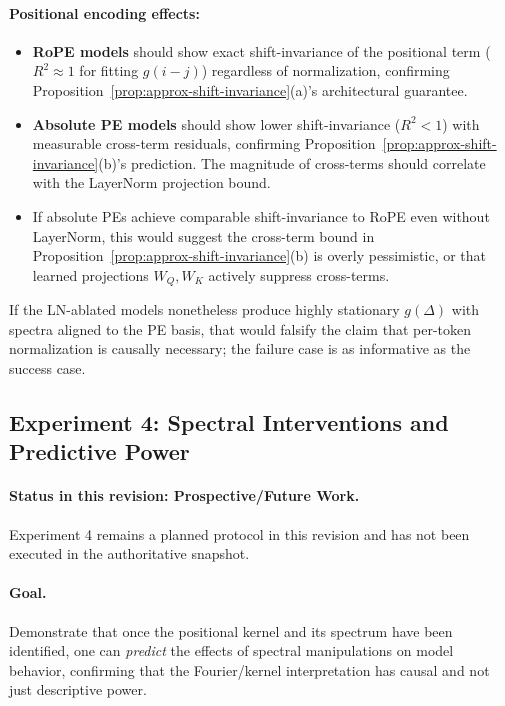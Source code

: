 \documentclass[11pt]{article}
\theoremstyle{definition}
\begin{document}
\paragraph{Positional encoding effects:}
\begin{itemize}
    \item \textbf{RoPE models} should show exact shift-invariance of the positional term ($R^2 \approx 1$ for fitting $g(i-j)$) regardless of normalization, confirming Proposition~\ref{prop:approx-shift-invariance}(a)'s architectural guarantee.
    \item \textbf{Absolute PE models} should show lower shift-invariance ($R^2 < 1$) with measurable cross-term residuals, confirming Proposition~\ref{prop:approx-shift-invariance}(b)'s prediction. The magnitude of cross-terms should correlate with the LayerNorm projection bound.
    \item If absolute PEs achieve comparable shift-invariance to RoPE even without LayerNorm, this would suggest the cross-term bound in Proposition~\ref{prop:approx-shift-invariance}(b) is overly pessimistic, or that learned projections $W_Q, W_K$ actively suppress cross-terms.
\end{itemize}

If the LN-ablated models nonetheless produce highly stationary \(g(\Delta)\) with spectra aligned to the PE basis, that would falsify the claim that per-token normalization is causally necessary; the failure case is as informative as the success case.

\subsection{Experiment 4: Spectral Interventions and Predictive Power}
\label{sec:exp-spectral-intervention}

\paragraph{Status in this revision: \textbf{Prospective/Future Work}.}
Experiment 4 remains a planned protocol in this revision and has not been executed in the authoritative snapshot.

\paragraph{Goal.}
Demonstrate that once the positional kernel and its spectrum have been identified, one can \emph{predict} the effects of spectral manipulations on model behavior, confirming that the Fourier/kernel interpretation has causal and not just descriptive power.
\end{document}
